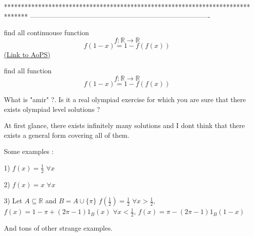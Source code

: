 *******************************************************************************
-------------------------------------------------------------------------------

\begin{problem}
	find all continuouse function \[f:\mathbb{R}\rightarrow \mathbb{R}\]
\[f(1-x)=1-f(f(x))\]
	\flushright \href{https://artofproblemsolving.com/community/c6h570139}{(Link to AoPS)}
\end{problem}



\begin{solution}
	\begin{tcolorbox}find all function \[f:\mathbb{R}\rightarrow \mathbb{R}\]
\[f(1-x)=1-f(f(x))\]\end{tcolorbox}
What is "amir" ?. Is it a real olympiad exercise for which you are sure that there exists olympiad level solutions ?

At first glance, there exists infinitely many solutions and I dont think that there exists a general form covering all of them.

Some examples :

1) $f(x)=\frac 12$ $\forall x$

2) $f(x)=x$ $\forall x$

3) Let $A\subseteq\mathbb R$ and $B=A\cup\{\pi\}$
$f(\frac 12)=\frac 12$
$\forall x>\frac 12$, $f(x)=1-\pi+(2\pi-1)1_B(x)$
$\forall x<\frac 12$, $f(x)=\pi-(2\pi-1)1_B(1-x)$

And tons of other strange examples.
\end{solution}



